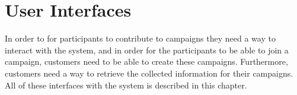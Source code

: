 
\chapter{User Interfaces}
\label{cha:user_interfaces}

In order to for participants to contribute to campaigns they need a way to interact with the system, and in order for the participants to be able to join a campaign, customers need to be able to create these campaigns. Furthermore, customers need a way to retrieve the collected information for their campaigns. All of these interfaces with the system is described in this chapter.



